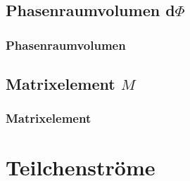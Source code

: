 \documentclass[hyperref={pdfpagelabels=false}]{beamer}
\begin{document}
\subsection{Phasenraumvolumen d$\Phi$}
\begin{frame}
\frametitle{Phasenraumvolumen}

\end{frame}

\subsection{Matrixelement $M$}
\begin{frame}
\frametitle{Matrixelement}
\end{frame}


\section{Teilchenstr\"ome}
\begin{frame}
\tableofcontents[currentsection]
\end{frame}
\end{document}
